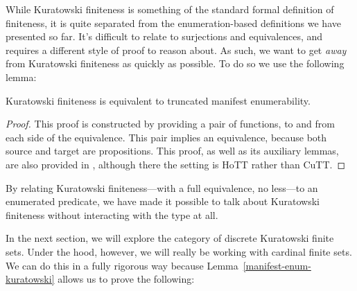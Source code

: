 While Kuratowski finiteness is something of the standard formal definition of
finiteness, it is quite separated from the enumeration-based definitions we have
presented so far.
It's difficult to relate to surjections and equivalences, and requires a
different style of proof to reason about.
As such, we want to get \emph{away} from Kuratowski finiteness as quickly as
possible.
To do so we use the following lemma:
\begin{lemma}  \label{manifest-enum-kuratowski}
  Kuratowski finiteness is equivalent to truncated manifest enumerability.
  \begin{agdalisting}
  \end{agdalisting}
\end{lemma}
\begin{proof} 
  This proof is constructed by providing a pair of functions, to and from each
  side of the equivalence.
  This pair implies an equivalence, because both source and target are
  propositions.
  This proof, as well as its auxiliary lemmas, are also provided in
  \citet{fruminFiniteSetsHomotopy2018}, although there the setting is HoTT
  rather than CuTT. 
\end{proof}
By relating Kuratowski finiteness---with a full equivalence, no less---to an
enumerated predicate, we have made it possible to talk about Kuratowski
finiteness without interacting with the type at all.

In the next section, we will explore the category of discrete Kuratowski finite
sets.
Under the hood, however, we will really be working with cardinal finite sets.
We can do this in a fully rigorous way because
Lemma~\ref{manifest-enum-kuratowski} allows us to prove the following:
\begin{agdalisting} \label{cardinal-kuratowski}
\end{agdalisting}

